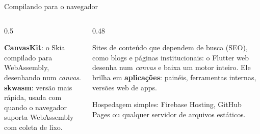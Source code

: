 \documentclass[aspectratio=169,10pt]{beamer}
\begin{document}
\begin{frame}[fragile]{Compilando para o navegador}
  \begin{columns}[T]
    \begin{column}{0.5\textwidth}
      \begin{conceito}[Renderizadores]
        \textbf{CanvasKit}: o Skia compilado para WebAssembly, desenhando num \emph{canvas}.\\
        \textbf{skwasm}: versão mais rápida, usada com  quando o navegador suporta WebAssembly com coleta de lixo.
      \end{conceito}
    \end{column}
    \begin{column}{0.48\textwidth}
      \begin{atencao}
        Sites de conteúdo que dependem de busca (SEO), como blogs e páginas institucionais: o Flutter web desenha num \emph{canvas} e baixa um motor inteiro. Ele brilha em \textbf{aplicações}: painéis, ferramentas internas, versões web de apps.
      \end{atencao}
      \begin{dica}
        Hospedagem simples: Firebase Hosting, GitHub Pages ou qualquer servidor de arquivos estáticos.
      \end{dica}
    \end{column}
  \end{columns}
\end{frame}
\end{document}

